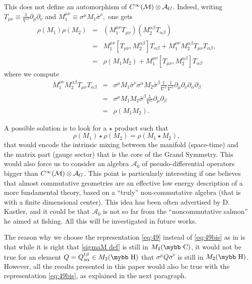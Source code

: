 \documentclass[11pt]{article}
\newcommand{\cinf}{{C^\infty({\cal M})}}
\newcommand{\A}{\mathcal A}
\def\bb#1{\hbox{\mybb#1}}
\begin{document}
This does not define an automorphism of
$\cinf\otimes \A_G$. Indeed, 
writing $T_{\mu\nu}\equiv\frac{1}{\nabla^{2}}\partial_{\mu}\partial_{\nu}$
and $M_{1}^{\mu\nu}\equiv\sigma^{\mu}M_{1}\bar{\sigma}^{\nu},$
one gets
\begin{eqnarray}
\rho(M_{1})\rho(M_{2}) & = & \left(M_{1}^{\mu\nu}T_{\mu\nu}\right)\left(M_{2}^{\alpha\beta}T_{\alpha\beta}\right)\\
 & = &
 M_{1}^{\mu\nu}\left[T_{\mu\nu},M_{2}^{\alpha\beta}\right]T_{\alpha\beta}+M_{1}^{\mu\nu}M_{2}^{\alpha\beta}T_{\mu\nu}T_{\alpha\beta},\\
&=& \rho(M_{1}M_{2})+M_{1}^{\mu\nu}\left[T_{\mu\nu},M_{2}^{\alpha\beta}\right]T_{\alpha\beta}
\end{eqnarray}
where
we compute
\begin{eqnarray}
M_{1}^{\mu\nu}M_{2}^{\alpha\beta}T_{\mu\nu}T_{\alpha\beta} & = & \sigma^{\mu}M_{1}\bar{\sigma}^{\nu}\sigma^{\alpha}M_{2}\bar{\sigma}^{\beta}\frac{1}{\nabla^{2}}\frac{1}{\nabla^{2}}\partial_{\mu}\partial_{\nu}\partial_{\alpha}\partial_{\beta}\nonumber \\
 & = & \sigma^{\mu}M_{1}M_{2}\bar{\sigma}^{\beta}\frac{1}{\nabla^{2}}\partial_{\mu}\partial_{\beta}\nonumber \\
 & = & \rho(M_{1}M_{2}).
\end{eqnarray} 

A possible solution is to look for a
$\star$ product such that
\begin{equation}
\rho(M_{1})\star\rho(M_{2})=\rho(M_{1}\star M_{2}),\label{eq: star product}
\end{equation}
that would encode the intrinsic mixing between
the manifold (space-time) and the matrix part (gauge sector) that
is the core of the Grand Symmetry. This would also force us to
consider an algebra $\A_0$ of pseudo-differential operators bigger than
$\cinf\otimes \A_G$. This point is particularly interesting if one
believes that almost commutative geometries are an
effective low energy description of a more fundamental theory, based
on a ``truly'' non-commutative algebra (that is with a finite
dimensional center). This idea
has been often advertised by D. Kastler, and it could be that $\A_0$
is not so far from the ``noncommutative salmon'' he aimed at
fishing. All this will be investigated in future works.
\medskip

The reason why we choose the representation \eqref{eq:49}  instead of
\eqref{eq:49bis} as in \cite{Devastato:2013fk} is that while it is
right that \eqref{sigmaM def}
is still in $M_4(\bb C)$, it would
not be true for an element $Q=Q_{\dot s\alpha}^{\dot t\beta}\in
M_2(\bb H)$
that $\sigma^{\mu}Q\bar\sigma^\nu$ is still in $M_2(\bb H)$.
However, all the results presented in this paper would also be true
with the representation  \eqref{eq:49bis}, as explained in the
next paragraph.
\end{document}
